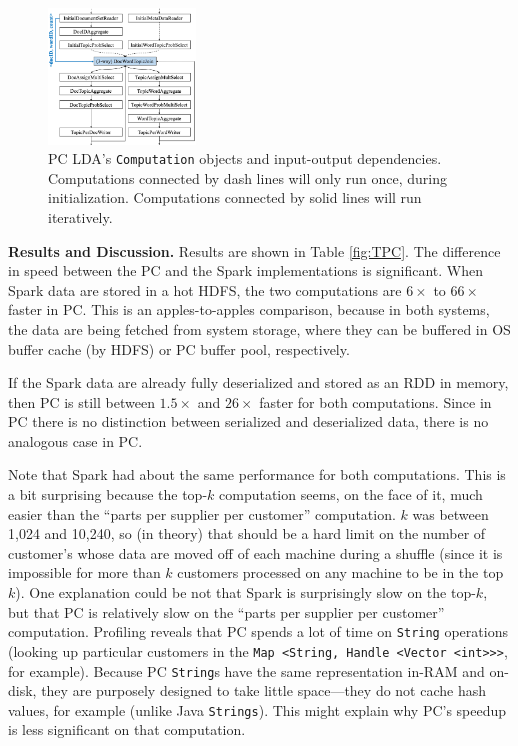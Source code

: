 \begin{figure}
\centering
\includegraphics[width=0.35\textwidth]{lda-query-graph.pdf}
  \caption{\label{fig:lda-query-graph} PC LDA's \texttt{Computation} objects and input-output dependencies. Computations
    connected by dash lines will only run once, during  
    initialization. Computations connected by solid lines will run iteratively.}
\vspace{-15pt}
\end{figure}

\vspace{5pt}
\noindent
\textbf{Results and Discussion.} Results are shown in Table \ref{fig:TPC}.  The difference in speed between the PC and the Spark implementations
is significant.
When Spark data
are stored in
a hot HDFS, the two computations are $6\times$ to $66\times$ faster in PC.  
This is an apples-to-apples comparison, because in both systems, the data are being fetched from system storage, where they
can be buffered in OS buffer cache (by HDFS) or PC buffer pool, respectively.

If the Spark data are already
fully deserialized and stored as an RDD in memory, then PC is still 
between $1.5\times$ and $26\times$ faster
for both computations. Since in PC there is no distinction between
serialized and deserialized data, there is no analogous case in PC. 

Note that Spark had about the same performance for both computations.  This is
a bit surprising because the top-$k$ computation seems, on the face of it, much easier 
than the ``parts per supplier per customer'' computation.  $k$ was between 1,024 and 10,240, so (in theory) that should be
a hard limit on the number of customer's whose data are moved off of each machine during a shuffle 
(since it is impossible for more than $k$
customers processed on any machine to be in the top $k$).  One explanation could be not that Spark is surprisingly slow on the
top-$k$, but that PC is relatively slow on the ``parts per supplier per customer'' computation.  Profiling reveals that PC spends
a lot of time on \texttt{String} operations (looking up particular customers in the
\texttt{Map <String, Handle <Vector <int}\texttt{>}\texttt{>}\texttt{>}, for example).  
Because PC \texttt{String}s have the same representation in-RAM and on-disk, they are purposely designed to take little
space---they do not cache hash values, for example (unlike Java \texttt{Strings}).  This might explain why PC's speedup is
less significant on that computation.

